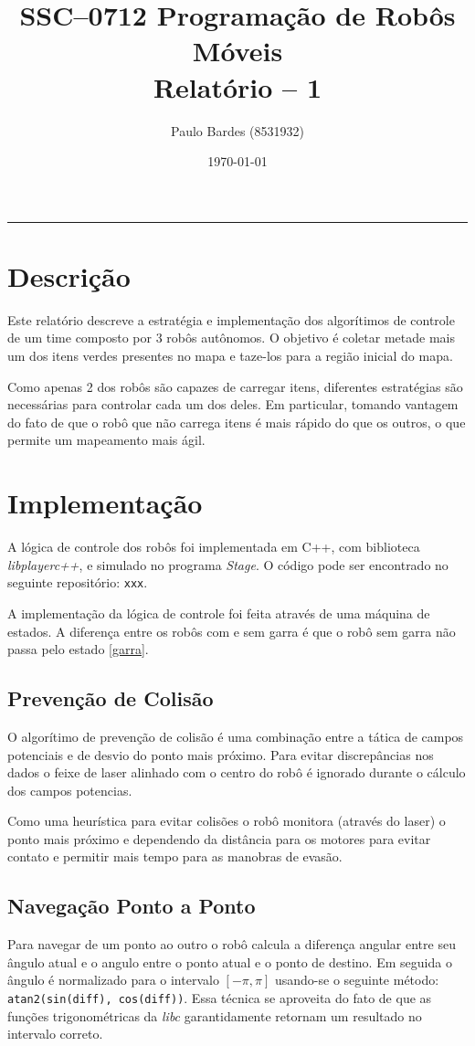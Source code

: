 \documentclass[11pt,oneside]{article}
\title{
\vspace{-3cm}	%
SSC--0712 Programação de Robôs Móveis \\
Relatório -- 1
}
\author {
Paulo Bardes (8531932)
}
\date {\today}
\begin{document}
\maketitle
\vspace{-6mm}
\hrule

\section{Descrição}
Este relatório descreve a estratégia e implementação dos algorítimos de controle de um time composto por 3 robôs autônomos. O objetivo é coletar metade mais um dos itens verdes presentes no mapa e taze-los para a região inicial do mapa.

Como apenas 2 dos robôs são capazes de carregar itens, diferentes estratégias são necessárias para controlar cada um dos deles. Em particular, tomando vantagem do fato de que o robô que não carrega itens é mais rápido do que os outros, o que permite um mapeamento mais ágil.

\section{Implementação}

A lógica de controle dos robôs foi implementada em C++, com biblioteca \emph{libplayerc++}, e simulado no programa \emph{Stage}. O código pode ser encontrado no seguinte repositório: \texttt{xxx}.

A implementação da lógica de controle foi feita através de uma máquina de estados. A diferença entre os robôs com e sem garra é que o robô sem garra não passa pelo estado \ref{garra}.

\subsection{Prevenção de Colisão}
O algorítimo de prevenção de colisão é uma combinação entre a tática de campos potenciais e de desvio do ponto mais próximo. Para evitar discrepâncias nos dados o feixe de laser alinhado com o centro do robô é ignorado durante o cálculo dos campos potencias.

Como uma heurística para evitar colisões o robô monitora (através do laser) o ponto mais próximo e dependendo da distância para os motores para evitar contato e permitir mais tempo para as manobras de evasão.

\subsection{Navegação Ponto a Ponto}
Para navegar de um ponto ao outro o robô calcula a diferença angular entre seu ângulo atual e o angulo entre o ponto atual e o ponto de destino. Em seguida o ângulo é normalizado para o intervalo $[-\pi, \pi]$ usando-se o seguinte método: \texttt{atan2(sin(diff), cos(diff))}. Essa técnica se aproveita do fato de que as funções trigonométricas da \emph{libc} garantidamente retornam um resultado no intervalo correto.
\end{document}
